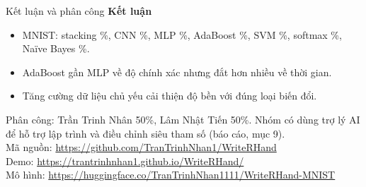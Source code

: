 \documentclass[aspectratio=169,10pt,t]{beamer}
\newcommand{\bul}{\begin{itemize}\setlength{\itemsep}{4pt}}
\newcommand{\eul}{\end{itemize}}
\begin{document}
\begin{frame}{Kết luận và phân công}
  \small
  \textbf{Kết luận}
  \bul
    \item MNIST: stacking \stackAccTest\%, CNN \accTestCNN\%, MLP \accTestMLP\%, AdaBoost \accTestADA\%, SVM \svmAccTest\%, softmax \accTestSM\%, Naïve Bayes \accTestNB\%.
    \item AdaBoost gần MLP về độ chính xác nhưng đắt hơn nhiều về thời gian.
    \item Tăng cường dữ liệu chủ yếu cải thiện độ bền với đúng loại biến đổi.
  \eul
  \vfill
  \footnotesize\raggedright
  Phân công: Trần Trinh Nhân 50\%, Lâm Nhật Tiến 50\%. Nhóm có dùng trợ lý AI để hỗ trợ lập trình và điều chỉnh siêu tham số (báo cáo, mục 9).\\[2pt]
  Mã nguồn: \url{https://github.com/TranTrinhNhan1/WriteRHand}\\
  Demo: \url{https://trantrinhnhan1.github.io/WriteRHand/}\\
  Mô hình: \url{https://huggingface.co/TranTrinhNhan1111/WriteRHand-MNIST}
\end{frame}
\end{document}
